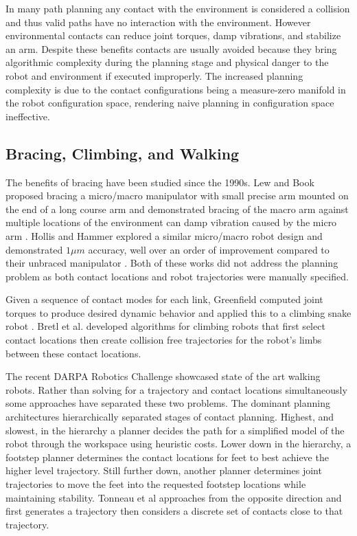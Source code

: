 \documentclass[../thesis.tex]{subfiles}
\begin{document}
In many path planning any contact with the environment is considered a collision and thus valid paths have no interaction with the environment.
However environmental contacts can reduce joint torques, damp vibrations, and stabilize an arm.
Despite these benefits contacts are usually avoided because they bring algorithmic complexity during the planning stage and physical danger to the robot and environment if executed improperly.
The increased planning complexity is due to the contact configurations being a measure-zero manifold in the robot configuration space, rendering naive planning in configuration space ineffective. 


\subsection{Bracing, Climbing, and Walking}
The benefits of bracing have been studied since the 1990s.
Lew and Book proposed bracing a micro/macro manipulator with small precise arm mounted on the end of a long course arm and demonstrated bracing of the macro arm against multiple locations of the environment can damp vibration caused by the micro arm \cite{Book1994} \cite{Lew1993}.
Hollis and Hammer explored a similar micro/macro robot design and demonstrated $1 \mu m$ accuracy, well over an order of improvement compared to their unbraced manipulator \cite{Hollis1992}.
Both of these works did not address the planning problem as both contact locations and robot trajectories were manually specified.


Given a sequence of contact modes for each link, Greenfield computed joint torques to produce desired dynamic behavior and applied this to a climbing snake robot \cite{Greenfield2005}.
Bretl et al. \cite{Bretl2006} developed algorithms for climbing robots that first select contact locations then create collision free trajectories for the robot's limbs between these contact locations.

The recent DARPA Robotics Challenge showcased state of the art walking robots.
Rather than solving for a trajectory and contact locations simultaneously some approaches have separated these two problems.
The dominant planning architectures hierarchically separated stages of contact planning.
Highest, and slowest, in the hierarchy a planner decides the path for a simplified model of the robot through the workspace using heuristic costs.
Lower down in the hierarchy, a footstep planner determines the contact locations for feet to best achieve the higher level trajectory.
Still further down, another planner determines joint trajectories to move the feet into the requested footstep locations while maintaining stability.  \cite{Deits2015} \cite{Atkeson2015}
Tonneau et al \cite{Tonneau} approaches from the opposite direction and first generates a trajectory then considers a discrete set of contacts close to that trajectory.
\end{document}
